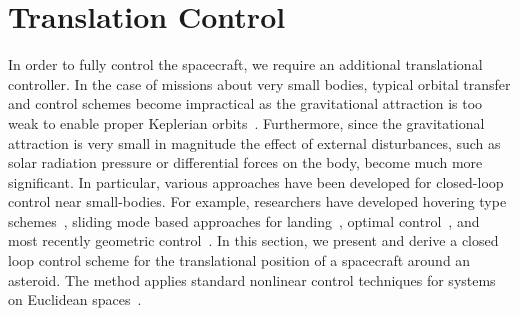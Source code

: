 \section{Translation Control}
In order to fully control the spacecraft, we require an additional translational controller.
In the case of missions about very small bodies, typical orbital transfer and control schemes become impractical as the gravitational attraction is too weak to enable proper Keplerian orbits~\cite{broschart2005}.
Furthermore, since the gravitational attraction is very small in magnitude the effect of external disturbances, such as solar radiation pressure or differential forces on the body, become much more significant.
In particular, various approaches have been developed for closed-loop control near small-bodies.
For example, researchers have developed hovering type schemes~\cite{broschart2005,sawai2002}, sliding mode based approaches for landing~\cite{furfaro2013,liaw2000,zexu2012}, optimal control~\cite{guelman1994,guo2011,lantoine2006,miso1999}, and most recently geometric control~\cite{kulumani2017b,misra2015a}.
In this section, we present and derive a closed loop control scheme for the translational position of a spacecraft around an asteroid.
The method applies standard nonlinear control techniques for systems on Euclidean spaces~\cite{khalil1996}.

